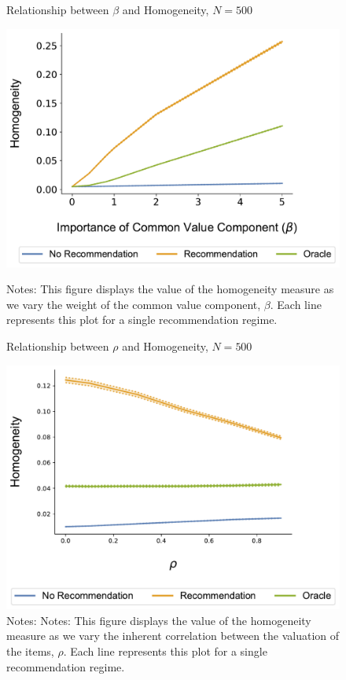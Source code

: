 \documentclass[format=acmsmall, review=true]{acmart}
\begin{document}
\begin{figure}[ht]
\caption{Relationship between $\beta$ and Homogeneity, $N = 500$}
\includegraphics[width=.45\linewidth]{figures/beta_homogeneity_N_200_T_20}\label{fig:beta_homo}
\caption*{\scriptsize Notes: This figure displays the value of the homogeneity measure as we vary the weight of the common value component, $\beta$. Each line represents this plot for a single recommendation regime.}
\end{figure}
\begin{figure}[ht]
\caption{Relationship between $\rho$ and Homogeneity, $N = 500$}
\includegraphics[width=.45\linewidth]{figures/rho_homogeneity_N_100_T_20}
\caption*{\scriptsize Notes: Notes: This figure displays the value of the homogeneity measure as we vary the inherent correlation between the valuation of the items, $\rho$. Each line represents this plot for a single recommendation regime.}\label{fig:cor_homo}
\end{figure}
\end{document}
